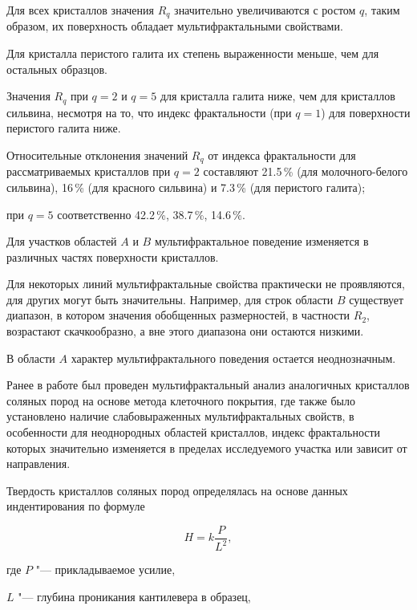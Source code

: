 Для всех кристаллов значения $R_q$ значительно увеличиваются с ростом $q$, таким образом, их поверхность обладает мультифрактальными свойствами. 

Для кристалла перистого галита их степень выраженности меньше, чем для остальных образцов.  

Значения $R_q$ при $q=2$ и $q=5$ для кристалла галита ниже, чем для кристаллов сильвина, несмотря на то, что индекс фрактальности (при $q=1$) для поверхности перистого галита ниже. 

Относительные отклонения значений $R_q$ от индекса фрактальности для рассматриваемых кристаллов при $q=2$ составляют  21.5\,\% (для молочного-белого сильвина), 16\,\% (для красного сильвина) и 7.3\,\% (для перистого галита); 

при $q=5$ соответственно 42.2\,\%, 38.7\,\%, 14.6\,\%. 



Для участков областей $A$ и $B$ мультифрактальное поведение изменяется в  различных частях поверхности кристаллов. 

Для некоторых линий мультифрактальные свойства практически не проявляются, для других могут быть значительны. Например, для строк области $B$ существует диапазон, в котором значения обобщенных размерностей, в частности $R_2$, возрастают скачкообразно, а вне этого диапазона они остаются низкими. 

В области $A$ характер мультифрактального поведения остается неоднозначным.

 

Ранее в работе \cite{l20} был проведен мультифрактальный анализ аналогичных кристаллов соляных пород на основе метода клеточного покрытия, где также было установлено наличие слабовыраженных мультифрактальных свойств, в особенности для неоднородных областей кристаллов, индекс фрактальности которых значительно изменяется в пределах исследуемого участка или зависит от направления.



\smallskip




Твердость кристаллов соляных пород определялась на основе данных индентирования по формуле

$$H= k\frac{P}{L^2},$$

где $P$ "--- прикладываемое усилие,  

$L$ "--- глубина проникания кантилевера в образец,

